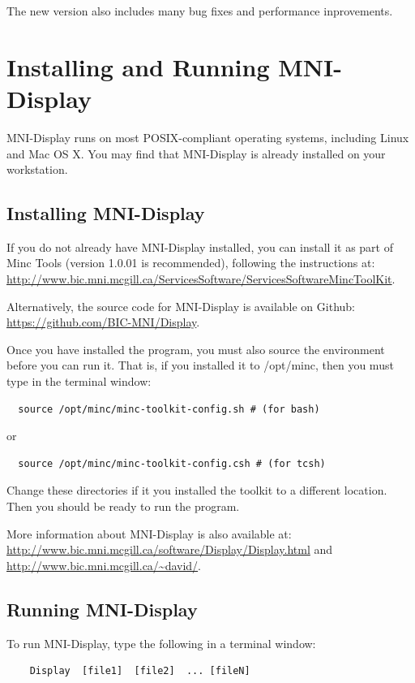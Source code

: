 \documentclass[11pt,letterpaper]{article}
\newcommand{\display}{\mbox{MNI-Display}}
\begin{document}
The new version also includes many bug fixes and performance inprovements.

\section{Installing and Running \display{}}

\display{} runs on most POSIX-compliant operating systems, including Linux
and Mac OS X. You may find that \display{} is already installed on your workstation.

\subsection{Installing \display{}}
If you do not already have \display{} installed, you can install it as
part of Minc Tools (version 1.0.01 is recommended), following the
instructions at:
\url{http://www.bic.mni.mcgill.ca/ServicesSoftware/ServicesSoftwareMincToolKit}.

Alternatively, the source code for MNI-Display is available on Github:
\url{https://github.com/BIC-MNI/Display}.

Once you have installed the program, you must also source the
environment before you can run it.  That is, if you installed it to
/opt/minc, then you must type in the terminal window:
\begin{verbatim}
  source /opt/minc/minc-toolkit-config.sh # (for bash)
\end{verbatim}
or
\begin{verbatim}
  source /opt/minc/minc-toolkit-config.csh # (for tcsh)
\end{verbatim}

Change these directories if it you installed the toolkit to a
different location. Then you should be ready to run the program.

More information about MNI-Display is also available at:
\url{http://www.bic.mni.mcgill.ca/software/Display/Display.html}
and
\url{http://www.bic.mni.mcgill.ca/~david/}.

\subsection{Running \display{}}

To run \display{}, type the following in a terminal window:

\begin{verbatim}
    Display  [file1]  [file2]  ... [fileN]
\end{verbatim}
\end{document}
